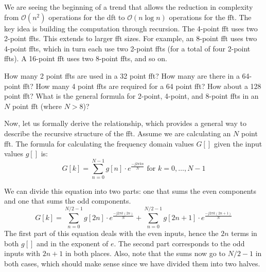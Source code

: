 We are seeing the beginning of a trend that allows the reduction in complexity from $\mathcal{O}(n^2)$ operations for the \gls{dft} to $\mathcal{O}(n \log n)$ operations for the \gls{fft}. The key idea is building the computation through recursion. The 4-point \gls{fft} uses two 2-point \gls{fft}s. This extends to larger \gls{fft} sizes. For example, an 8-point \gls{fft} uses two 4-point \gls{fft}s, which in turn each use two 2-point \gls{fft}s (for a total of four 2-point \gls{fft}s). A 16-point \gls{fft} uses two 8-point \gls{fft}s, and so on.

\begin{exercise}
How many 2 point \gls{fft}s are used in a 32 point \gls{fft}? How many are there in a 64-point \gls{fft}? How many 4 point \gls{fft}s are required for a 64 point \gls{fft}? How about a 128 point \gls{fft}?  What is the general formula for 2-point, 4-point, and 8-point \gls{fft}s in an $N$ point \gls{fft} (where $N > 8$)?
\end{exercise}

Now, let us formally derive the relationship, which provides a general way to describe the recursive structure of the \gls{fft}.  Assume we are calculating an $N$ point \gls{fft}. The formula for calculating the frequency domain values $G[]$ given the input values $g[]$ is:
\begin{equation}
G[k] = \displaystyle\sum\limits_{n=0}^{N-1} g[n] \cdot e^{\frac{-j 2 \pi k n}{N}} \text{ for } k = 0,\dots, N-1
\label{eq:fft-full}
\end{equation}

We can divide this equation into two parts: one that sums the even components and one that sums the odd components.
\begin{equation}
G[k] = \displaystyle\sum\limits_{n=0}^{N/2-1} g[2n] \cdot e^{\frac{-j 2 \pi k (2n)}{N}} + \displaystyle\sum\limits_{n=0}^{N/2-1} g[2n+1] \cdot e^{\frac{-j 2 \pi k (2n+1)}{N}}
\label{eq:fft-split}
\end{equation}
The first part of this equation deals with the even inputs, hence the $2n$ terms in both $g[]$ and in the exponent of $e$. The second part corresponds to the odd inputs with $2n +1$ in both places. Also, note that the sums now go to $N/2 -1$ in both cases, which should make sense since we have divided them into two halves. 

